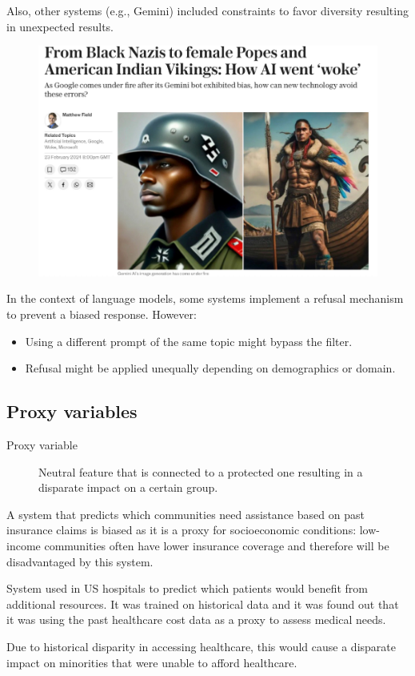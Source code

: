 \begin{example}[Generative AI]
    Also, other systems (e.g., Gemini) included constraints to favor diversity resulting in unexpected results.

    \begin{figure}[H]
        \centering
        \includegraphics[width=0.45\linewidth]{./img/gemini_diversity.png}
    \end{figure}

    In the context of language models, some systems implement a refusal mechanism to prevent a biased response. However:
    \begin{itemize}
        \item Using a different prompt of the same topic might bypass the filter.
        \item Refusal might be applied unequally depending on demographics or domain.
    \end{itemize}
\end{example}


\subsection{Proxy variables}

\begin{description}
    \item[Proxy variable] 
        Neutral feature that is connected to a protected one resulting in a disparate impact on a certain group.
\end{description}

\begin{example}
    A system that predicts which communities need assistance based on past insurance claims is biased as it is a proxy for socioeconomic conditions: low-income communities often have lower insurance coverage and therefore will be disadvantaged by this system.
\end{example}

\begin{example}
    System used in US hospitals to predict which patients would benefit from additional resources. It was trained on historical data and it was found out that it was using the past healthcare cost data as a proxy to assess medical needs.

    Due to historical disparity in accessing healthcare, this would cause a disparate impact on minorities that were unable to afford healthcare.
\end{example}

